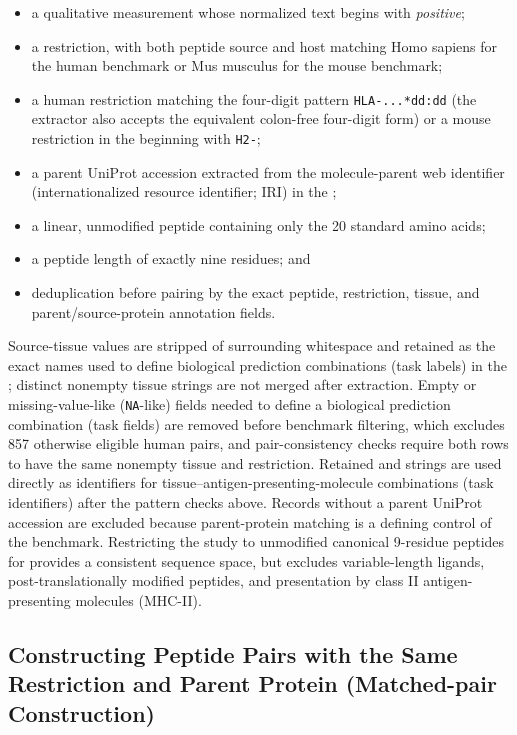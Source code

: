 \begin{itemize}
    \item a qualitative measurement whose normalized text begins with \emph{positive};
    \item a \plainMHCI{} restriction, with both peptide source and host matching Homo sapiens for the human benchmark or Mus musculus for the mouse benchmark;
    \item a human restriction matching the four-digit \plainHLA{} pattern \texttt{HLA-...*dd:dd} (the extractor also accepts the equivalent colon-free four-digit form) or a mouse restriction in the \plainHtwo{} beginning with \texttt{H2-};
    \item a parent UniProt accession extracted from the molecule-parent web identifier (internationalized resource identifier; IRI) in the \plainIEDB{};
    \item a linear, unmodified peptide containing only the 20 standard amino acids;
    \item a peptide length of exactly nine residues; and
    \item deduplication before pairing by the exact peptide, restriction, tissue, and parent/source-protein annotation fields.
\end{itemize}

Source-tissue values are stripped of surrounding whitespace and retained as the exact names used to define biological prediction combinations (task labels) in the \plainIEDB{}; distinct nonempty tissue strings are not merged after extraction. Empty or missing-value-like (\texttt{NA}-like) fields needed to define a biological prediction combination (task fields) are removed before benchmark filtering, which excludes 857 otherwise eligible human pairs, and pair-consistency checks require both rows to have the same nonempty tissue and restriction. Retained \plainHLA{} and \plainHtwo{} strings are used directly as identifiers for tissue--antigen-presenting-molecule combinations (task identifiers) after the pattern checks above. Records without a parent UniProt accession are excluded because parent-protein matching is a defining control of the benchmark. Restricting the study to unmodified canonical 9-residue peptides for \plainMHCI{} provides a consistent sequence space, but excludes variable-length ligands, post-translationally modified peptides, and presentation by class II antigen-presenting molecules (MHC-II).

\subsection{Constructing Peptide Pairs with the Same Restriction and Parent Protein (Matched-pair Construction)}

